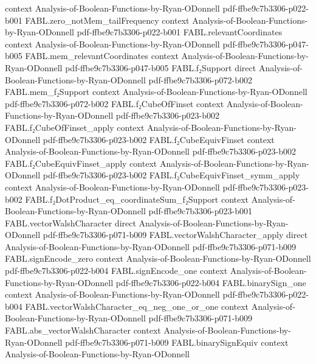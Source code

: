 \begin{theorem}
  {context}
  {Analysis-of-Boolean-Functions-by-Ryan-ODonnell}
  {pdf-ffbe9c7b3306-p022-b001}
\proofstep
  {FABL.zero_notMem_tailFrequency}
  {context}
  {Analysis-of-Boolean-Functions-by-Ryan-ODonnell}
  {pdf-ffbe9c7b3306-p022-b001}
\proofstep
  {FABL.relevantCoordinates}
  {context}
  {Analysis-of-Boolean-Functions-by-Ryan-ODonnell}
  {pdf-ffbe9c7b3306-p047-b005}
\proofstep
  {FABL.mem_relevantCoordinates}
  {context}
  {Analysis-of-Boolean-Functions-by-Ryan-ODonnell}
  {pdf-ffbe9c7b3306-p047-b005}
\proofstep
  {FABL.f₂Support}
  {direct}
  {Analysis-of-Boolean-Functions-by-Ryan-ODonnell}
  {pdf-ffbe9c7b3306-p072-b002}
\proofstep
  {FABL.mem_f₂Support}
  {context}
  {Analysis-of-Boolean-Functions-by-Ryan-ODonnell}
  {pdf-ffbe9c7b3306-p072-b002}
\proofstep
  {FABL.f₂CubeOfFinset}
  {context}
  {Analysis-of-Boolean-Functions-by-Ryan-ODonnell}
  {pdf-ffbe9c7b3306-p023-b002}
\proofstep
  {FABL.f₂CubeOfFinset_apply}
  {context}
  {Analysis-of-Boolean-Functions-by-Ryan-ODonnell}
  {pdf-ffbe9c7b3306-p023-b002}
\proofstep
  {FABL.f₂CubeEquivFinset}
  {context}
  {Analysis-of-Boolean-Functions-by-Ryan-ODonnell}
  {pdf-ffbe9c7b3306-p023-b002}
\proofstep
  {FABL.f₂CubeEquivFinset_apply}
  {context}
  {Analysis-of-Boolean-Functions-by-Ryan-ODonnell}
  {pdf-ffbe9c7b3306-p023-b002}
\proofstep
  {FABL.f₂CubeEquivFinset_symm_apply}
  {context}
  {Analysis-of-Boolean-Functions-by-Ryan-ODonnell}
  {pdf-ffbe9c7b3306-p023-b002}
\proofstep
  {FABL.f₂DotProduct_eq_coordinateSum_f₂Support}
  {context}
  {Analysis-of-Boolean-Functions-by-Ryan-ODonnell}
  {pdf-ffbe9c7b3306-p023-b001}
\proofstep
  {FABL.vectorWalshCharacter}
  {direct}
  {Analysis-of-Boolean-Functions-by-Ryan-ODonnell}
  {pdf-ffbe9c7b3306-p071-b009}
\proofstep
  {FABL.vectorWalshCharacter_apply}
  {direct}
  {Analysis-of-Boolean-Functions-by-Ryan-ODonnell}
  {pdf-ffbe9c7b3306-p071-b009}
\proofstep
  {FABL.signEncode_zero}
  {context}
  {Analysis-of-Boolean-Functions-by-Ryan-ODonnell}
  {pdf-ffbe9c7b3306-p022-b004}
\proofstep
  {FABL.signEncode_one}
  {context}
  {Analysis-of-Boolean-Functions-by-Ryan-ODonnell}
  {pdf-ffbe9c7b3306-p022-b004}
\proofstep
  {FABL.binarySign_one}
  {context}
  {Analysis-of-Boolean-Functions-by-Ryan-ODonnell}
  {pdf-ffbe9c7b3306-p022-b004}
\proofstep
  {FABL.vectorWalshCharacter_eq_neg_one_or_one}
  {context}
  {Analysis-of-Boolean-Functions-by-Ryan-ODonnell}
  {pdf-ffbe9c7b3306-p071-b009}
\proofstep
  {FABL.abs_vectorWalshCharacter}
  {context}
  {Analysis-of-Boolean-Functions-by-Ryan-ODonnell}
  {pdf-ffbe9c7b3306-p071-b009}
\proofstep
  {FABL.binarySignEquiv}
  {context}
  {Analysis-of-Boolean-Functions-by-Ryan-ODonnell}

\end{theorem}
